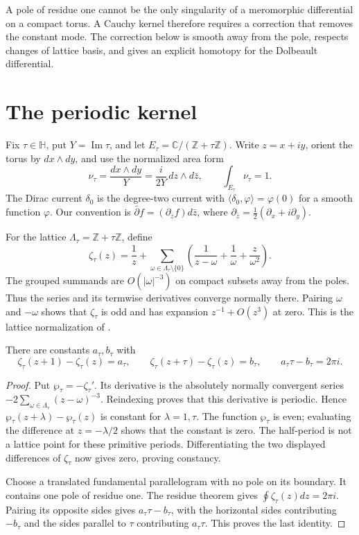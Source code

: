 A pole of residue one cannot be the only singularity of a meromorphic differential on a compact torus.
A Cauchy kernel therefore requires a correction that removes the constant mode.
The correction below is smooth away from the pole, respects changes of lattice basis, and gives an explicit homotopy for the Dolbeault differential.

\section{The periodic kernel}

Fix $\tau\in\mathbb H$, put $Y=\operatorname{Im}\tau$, and let
$E_\tau=\mathbb C/(\mathbb Z+\tau\mathbb Z)$.
Write $z=x+iy$, orient the torus by $dx\wedge dy$, and use the normalized area form
\[
 \nu_\tau=\frac{dx\wedge dy}{Y}
          =\frac{i}{2Y}\,dz\wedge d\bar z,
 \qquad \int_{E_\tau}\nu_\tau=1.
\]
The Dirac current $\delta_0$ is the degree-two current with
$\langle\delta_0,\varphi\rangle=\varphi(0)$ for a smooth function $\varphi$.
Our convention is $\bar\partial f=(\partial_{\bar z}f)d\bar z$, where
$\partial_{\bar z}=\tfrac12(\partial_x+i\partial_y)$.

For the lattice $\Lambda_\tau=\mathbb Z+\tau\mathbb Z$, define
\[
 \zeta_\tau(z)=\frac1z+
 \sum_{\omega\in\Lambda_\tau\setminus\{0\}}
 \left(\frac1{z-\omega}+\frac1\omega+\frac z{\omega^2}\right).
\]
The grouped summands are $O(|\omega|^{-3})$ on compact subsets away from the poles.
Thus the series and its termwise derivatives converge normally there.
Pairing $\omega$ and $-\omega$ shows that $\zeta_\tau$ is odd and has expansion $z^{-1}+O(z^3)$ at zero.
This is the lattice normalization of \cite[Eq.~23.2.5]{DLMFell}.

\begin{lemma}\label{lem:ep-periods}
There are constants $a_\tau,b_\tau$ with
\[
 \zeta_\tau(z+1)-\zeta_\tau(z)=a_\tau,\qquad
 \zeta_\tau(z+\tau)-\zeta_\tau(z)=b_\tau,
 \qquad a_\tau\tau-b_\tau=2\pi i.
\]
\end{lemma}
\begin{proof}
Put $\wp_\tau=-\zeta_\tau'$.
Its derivative is the absolutely normally convergent series
$-2\sum_{\omega\in\Lambda_\tau}(z-\omega)^{-3}$.
Reindexing proves that this derivative is periodic.
Hence $\wp_\tau(z+\lambda)-\wp_\tau(z)$ is constant for $\lambda=1,\tau$.
The function $\wp_\tau$ is even; evaluating the difference at $z=-\lambda/2$ shows that the constant is zero.
The half-period is not a lattice point for these primitive periods.
Differentiating the two displayed differences of $\zeta_\tau$ now gives zero, proving constancy.

Choose a translated fundamental parallelogram with no pole on its boundary.
It contains one pole of residue one.
The residue theorem gives $\oint\zeta_\tau(z)dz=2\pi i$.
Pairing its opposite sides gives $a_\tau\tau-b_\tau$, with the horizontal sides contributing $-b_\tau$ and the sides parallel to $\tau$ contributing $a_\tau\tau$.
This proves the last identity.
\end{proof}

